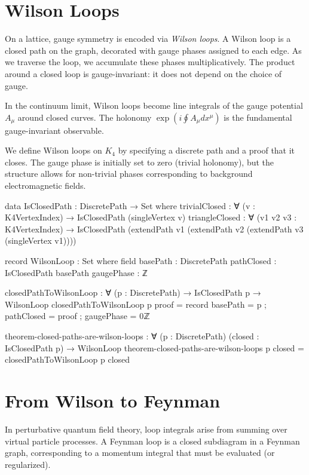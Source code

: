 \documentclass[11pt,a4paper]{book}
\begin{document}
\section{Wilson Loops}

On a lattice, gauge symmetry is encoded via \emph{Wilson loops}. A Wilson loop is a closed 
path on the graph, decorated with gauge phases assigned to each edge. As we traverse the 
loop, we accumulate these phases multiplicatively. The product around a closed loop is 
gauge-invariant: it does not depend on the choice of gauge.

In the continuum limit, Wilson loops become line integrals of the gauge potential $A_\mu$ 
around closed curves. The holonomy $\exp(i \oint A_\mu dx^\mu)$ is the fundamental 
gauge-invariant observable.

We define Wilson loops on $K_4$ by specifying a discrete path and a proof that it closes. 
The gauge phase is initially set to zero (trivial holonomy), but the structure allows for 
non-trivial phases corresponding to background electromagnetic fields.

\begin{code}
data IsClosedPath : DiscretePath → Set where
  trivialClosed : ∀ (v : K4VertexIndex) → IsClosedPath (singleVertex v)
  triangleClosed : ∀ (v1 v2 v3 : K4VertexIndex) → 
    IsClosedPath (extendPath v1 (extendPath v2 (extendPath v3 (singleVertex v1))))

record WilsonLoop : Set where
  field
    basePath : DiscretePath
    pathClosed : IsClosedPath basePath
    gaugePhase : ℤ

closedPathToWilsonLoop : ∀ (p : DiscretePath) → IsClosedPath p → WilsonLoop
closedPathToWilsonLoop p proof = record
  { basePath = p
  ; pathClosed = proof
  ; gaugePhase = 0ℤ
  }

theorem-closed-paths-are-wilson-loops : ∀ (p : DiscretePath) (closed : IsClosedPath p) →
  WilsonLoop
theorem-closed-paths-are-wilson-loops p closed = closedPathToWilsonLoop p closed
\end{code}

\section{From Wilson to Feynman}

In perturbative quantum field theory, loop integrals arise from summing over virtual particle 
processes. A Feynman loop is a closed subdiagram in a Feynman graph, corresponding to a 
momentum integral that must be evaluated (or regularized).
\end{document}
